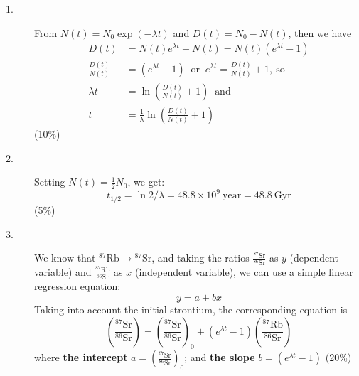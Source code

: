 \begin{description}
\item[1.] From $N(t) = N_0 \exp(-\lambda t)$ and $D(t) = N_0 - N(t)$, then we
  have
  \begin{align*}
    D(t) &= N(t)e^{\lambda t} - N(t) = N(t)(e^{\lambda t} - 1)\\
    \frac{D(t)}{N(t)} &= (e^{\lambda t} - 1)
      \ \text{ or }\ e^{\lambda t} = \frac{D(t)}{N(t)} + 1,\ \text{so}\\
    \lambda t &= \ln\left(\frac{D(t)}{N(t)} + 1\right) \ \text{ and}\\
    t &= \frac{1}{\lambda}\ln\left(\frac{D(t)}{N(t)} + 1\right)
  \end{align*}
  \hfill(10\%)

\item[2.] Setting $N(t) = \frac{1}{2}N_0$, we get:
  \[
    t_{1/2} = \ln 2/\lambda = 48.8 \times 10^{9}\ \mathrm{year}
            = 48.8\ \mathrm{Gyr}
  \]
  \hfill(5\%)

\item[3.] We know that $^{87}\mathrm{Rb} \rightarrow {}^{87}\mathrm{Sr}$, and
  taking the ratios $\frac{^{87}\mathrm{Sr}}{^{86}\mathrm{Sr}}$ as $y$
  (dependent variable) and $\frac{^{87}\mathrm{Rb}}{^{86}\mathrm{Sr}}$ as $x$
  (independent variable), we can use a simple linear regression equation:
  \[
    y = a + bx
  \]
  Taking into account the initial strontium, the corresponding equation is
  \[
    \left(\frac{^{87}\mathrm{Sr}}{^{86}\mathrm{Sr}}\right)
    = \left(\frac{^{87}\mathrm{Sr}}{^{86}\mathrm{Sr}}\right)_0
    + \left(e^{\lambda t} - 1\right)
      \left(\frac{^{87}\mathrm{Rb}}{^{86}\mathrm{Sr}}\right)
  \]
  where \textbf{the intercept}
  $a = \left(\frac{^{87}\mathrm{Sr}}{^{86}\mathrm{Sr}}\right)_0$;
  and \textbf{the slope} $b = \left(e^{\lambda t} - 1\right)$
  \hfill(20\%)


\end{description}

